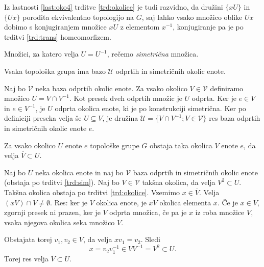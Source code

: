 \documentclass[mat1]{fmfdelo}
\newcommand{\Ucurl}{\mathcal{U}}
\newcommand{\closure}[1]{\overline{#1}}
\begin{document}
\begin{dokaz}
Iz lastnosti \ref{last:oko4} trditve \ref{trd:okolice} je tudi razvidno, da družini $\lbrace xU \rbrace$ in $\lbrace Ux \rbrace$ porodita ekvivalentno topologijo na $G$, saj lahko vsako množico oblike $Ux$ dobimo s konjugiranjem množice $xU$ z elementom $x^{-1}$, konjugiranje pa je po trditvi \ref{trd:trans} homeomorfizem.
\end{dokaz}

\begin{definicija}\label{def:sim}
Množici, za katero velja $U = U^{-1}$, rečemo \emph{simetrična} množica.
\end{definicija}

\begin{trditev}\label{trd:sim}
Vsaka topološka grupa ima bazo $\Ucurl$ odprtih in simetričnih okolic enote.
\end{trditev}

\begin{dokaz}
Naj bo $\mathcal{V}$ neka baza odprtih okolic enote. Za vsako okolico $V \in \mathcal{V}$ definiramo množico $U = V \cap V^{-1}$. Kot presek dveh odprtih množic je $U$ odprta. Ker je $e \in V$ in $e \in V^{-1}$, je $U$ odprta okolica enote, ki je po konstrukciji simetrična. Ker po definiciji preseka velja še $U \subseteq V$, je družina $\Ucurl = \lbrace V \cap V^{-1}; V \in \mathcal{V} \rbrace$ res baza odprtih in simetričnih okolic enote $e$.
\end{dokaz}

\begin{posledica}\label{pos:sim}
Za vsako okolico $U$ enote $e$ topološke grupe $G$ obstaja taka okolica $V$ enote $e$, da velja $\closure{V} \subset U$.
\end{posledica}

\begin{dokaz}
Naj bo $U$ neka okolica enote in naj bo $\mathcal{V}$ baza odprtih in simetričnih okolic enote (obstaja po trditvi \ref{trd:sim}). Naj bo $V \in \mathcal{V}$ takšna okolica, da velja $V^2 \subset U$. Takšna okolica obstaja po trditvi \ref{trd:okolice}. Vzemimo $x \in \closure{V}$. Velja $(xV) \cap V \neq \emptyset$.
Res: ker je $V$ okolica enote, je $xV$ okolica elementa $x$. Če je $x \in V$, zgornji presek ni prazen, ker je $V$ odprta množica, če pa je $x$ iz roba množice $V$, vsaka njegova okolica seka množico $V$.

Obstajata torej $v_1, v_2 \in V$, da velja $x v_1 = v_2$. Sledi \[x = v_2 v_1^{-1} \in VV^{-1} = V^2 \subset U.\]
Torej res velja $\closure{V} \subset U$.
\end{dokaz}
\end{document}
